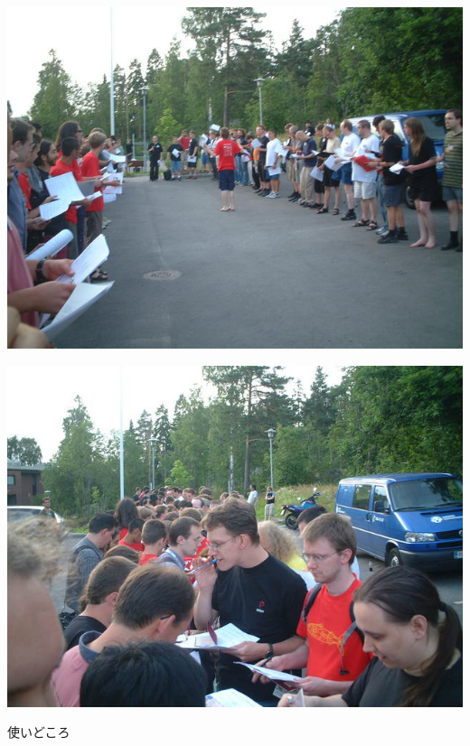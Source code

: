 \begin{frame}
\begin{center}
\includegraphics[width=1\hsize]{image200909/ksp00.jpg}

\end{center}
\end{frame}

\begin{frame}
\begin{center}

\includegraphics[width=1\hsize]{image200909/ksp01.jpg}
\end{center}
\end{frame}

\begin{frame}
\begin{center}
\Huge 使いどころ
\end{center}
\end{frame}

